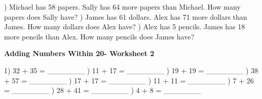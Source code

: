 \documentclass{article}%
\begin{document}
\newline%
\newline%
) Michael has 58 papers. Sally has 64 more papers than Michael. How many papers does Sally have?%
\newline%
\newline%
) James has 61 dollars. Alex has 71 more dollars than James. How many dollars does Alex have?%
\newline%
\newline%
) Alex has 5 pencils. James has 18 more pencils than Alex. How many pencils does James have?%
\newline%
\newline%
\newline%
\pagebreak%
\large%
\begin{center}%
\textbf{Adding Numbers Within 20- Worksheet 2}%
\newline%
\end{center} \normalsize%
1) 32 + 35 = \_\_\_\_\_\_\_%
\newline%
\newline%
) 11 + 17 = \_\_\_\_\_\_\_%
\newline%
\newline%
) 19 + 19 = \_\_\_\_\_\_\_%
\newline%
\newline%
) 38 + 57 = \_\_\_\_\_\_\_%
\newline%
\newline%
) 17 + 17 = \_\_\_\_\_\_\_%
\newline%
\newline%
) 11 + 11 = \_\_\_\_\_\_\_%
\newline%
\newline%
) 7 + 26 = \_\_\_\_\_\_\_%
\newline%
\newline%
) 28 + 41 = \_\_\_\_\_\_\_%
\newline%
\newline%
) 4 + 8 = \_\_\_\_\_\_\_%
\newline%
\end{document}
